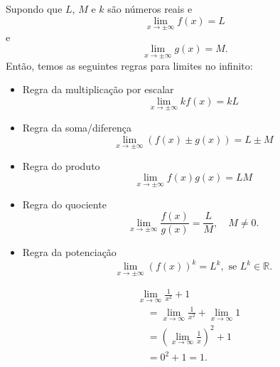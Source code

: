 \begin{obs}\label{obs:lim_regras_xinf}
Supondo que $L$, $M$ e $k$ são números reais e
\begin{equation}
  \lim_{x\to \pm\infty} f(x) = L
\end{equation}
e
\begin{equation}
  \lim_{x\to\pm\infty}g(x) = M.
\end{equation}
Então, temos as seguintes regras para limites no infinito:
\begin{itemize}
\item Regra da multiplicação por escalar
  \begin{equation}
    \lim_{x\to\pm\infty} kf(x) = kL
  \end{equation}
\item Regra da soma/diferença
  \begin{equation}
    \lim_{x\to\pm\infty} (f(x)\pm g(x)) = L\pm M
  \end{equation}
\item Regra do produto
  \begin{equation}
    \lim_{x\to\pm\infty} f(x)g(x) = LM
  \end{equation}
\item Regra do quociente
  \begin{equation}
    \lim_{x\to\pm\infty} \frac{f(x)}{g(x)} = \frac{L}{M},\quad M\neq 0.
  \end{equation}
\item Regra da potenciação
  \begin{equation}
    \lim_{x\to\pm\infty} (f(x))^k = L^k,\text{ se } L^k\in\mathbb{R}.
  \end{equation}
\end{itemize}
\end{obs}

\begin{ex}
  \begin{align}
    & \lim_{x\to \infty} \frac{1}{x^2}+1 \\
    & \text{}\quad = \lim_{x\to \infty} \frac{1}{x^2} + \lim_{x\to \infty}1 \\
    &  \text{}\quad = \left(\lim_{x\to\infty} \frac{1}{x}\right)^2 + 1 \\
    & \text{}\quad = 0^2 + 1 = 1.
\end{align}
\end{ex}

